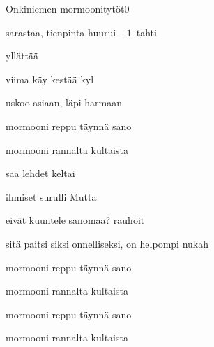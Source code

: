 \documentclass[12pt,a4paper]{article}
\begin{document}
\thispagestyle{empty}
\begin{mysong}{Onkiniemen mormoonitytöt}{0}

\begin{SBVerse}
   sarastaa,  tienpinta huurui
  {\SBLyricNoteFont $-1$~tahti}

   yllättää  

   viima käy   kestää
  kyl 

   uskoo asiaan,   läpi harmaan
   
\end{SBVerse}

\begin{SBChorus}
   mormooni  reppu täynnä
  sano 

   mormooni  rannalta kultaista
   
\end{SBChorus}

\begin{SBVerse}
   saa  lehdet  keltai

   ihmiset surulli Mutta  

   eivät kuuntele  sanomaa? 
  rauhoit 

   sitä paitsi siksi  onnelliseksi,  on
  helpompi nukah 
\end{SBVerse}

\begin{SBChorus}
   mormooni  reppu täynnä
  sano 

   mormooni  rannalta kultaista
   
\end{SBChorus}


\begin{SBChorus}
   mormooni  reppu täynnä
  sano 

   mormooni  rannalta kultaista
   
\end{SBChorus}



\end{mysong}
\end{document}
